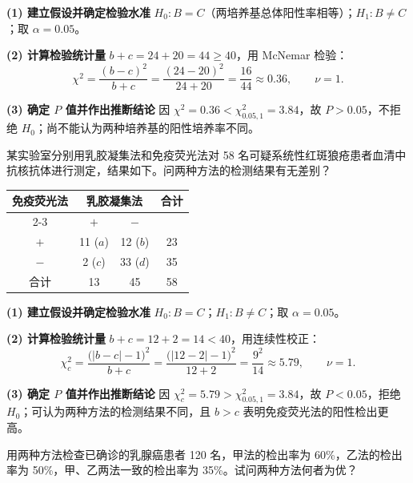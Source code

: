 \documentclass[lang=cn,10pt]{elegantbook}
\begin{document}
\begin{solution}
\textbf{(1) 建立假设并确定检验水准}\quad
$H_0: B=C$（两培养基总体阳性率相等）；$H_1: B\ne C$；取 $\alpha=0.05$。

\textbf{(2) 计算检验统计量}\quad
$b+c=24+20=44\ge 40$，用 McNemar 检验：
\[
\chi^2=\frac{(b-c)^2}{b+c}=\frac{(24-20)^2}{24+20}=\frac{16}{44}\approx 0.36,\qquad \nu=1.
\]

\textbf{(3) 确定 $P$ 值并作出推断结论}\quad
因 $\chi^2=0.36<\chi^2_{0.05,1}=3.84$，故 $P>0.05$，不拒绝 $H_0$；尚不能认为两种培养基的阳性培养率不同。
\end{solution}

\begin{exercise}
某实验室分别用乳胶凝集法和免疫荧光法对 58 名可疑系统性红斑狼疮患者血清中抗核抗体进行测定，结果如下。问两种方法的检测结果有无差别？

\begin{center}
\begin{tabular}{cccc}
  \hline
  \multirow{2}{*}{免疫荧光法} & \multicolumn{2}{c}{乳胶凝集法} & \multirow{2}{*}{合计}\\
  \cline{2-3}
  & $+$ & $-$ & \\
  \hline
  $+$ & 11 ($a$) & 12 ($b$) & 23\\
  $-$ & 2 ($c$) & 33 ($d$) & 35\\
  \hline
  合计 & 13 & 45 & 58\\
  \hline
\end{tabular}
\end{center}
\end{exercise}

\begin{solution}
\textbf{(1) 建立假设并确定检验水准}\quad
$H_0: B=C$；$H_1: B\ne C$；取 $\alpha=0.05$。

\textbf{(2) 计算检验统计量}\quad
$b+c=12+2=14<40$，用连续性校正：
\[
\chi_c^2=\frac{\bigl(|b-c|-1\bigr)^2}{b+c}
=\frac{\bigl(|12-2|-1\bigr)^2}{12+2}
=\frac{9^2}{14}\approx 5.79,\qquad \nu=1.
\]

\textbf{(3) 确定 $P$ 值并作出推断结论}\quad
因 $\chi_c^2=5.79>\chi^2_{0.05,1}=3.84$，故 $P<0.05$，拒绝 $H_0$；可认为两种方法的检测结果不同，且 $b>c$ 表明免疫荧光法的阳性检出更高。
\end{solution}

\begin{exercise}
用两种方法检查已确诊的乳腺癌患者 120 名，甲法的检出率为 60\%，乙法的检出率为 50\%，甲、乙两法一致的检出率为 35\%。试问两种方法何者为优？
\end{exercise}
\end{document}
